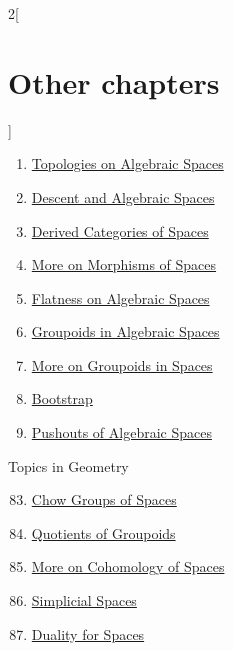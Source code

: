 \begin{multicols}{2}[\section{Other chapters}]
\begin{enumerate}
\item \href{https://github.com/stacks/stacks-project/blob/a04446e57ec1fbc252a871afcec7752fb2807b14/spaces-topologies.tex}{Topologies on Algebraic Spaces}
\item \href{https://github.com/stacks/stacks-project/blob/a04446e57ec1fbc252a871afcec7752fb2807b14/spaces-descent.tex}{Descent and Algebraic Spaces}
\item \href{https://github.com/stacks/stacks-project/blob/a04446e57ec1fbc252a871afcec7752fb2807b14/spaces-perfect.tex}{Derived Categories of Spaces}
\item \href{https://github.com/stacks/stacks-project/blob/a04446e57ec1fbc252a871afcec7752fb2807b14/spaces-more-morphisms.tex}{More on Morphisms of Spaces}
\item \href{https://github.com/stacks/stacks-project/blob/a04446e57ec1fbc252a871afcec7752fb2807b14/spaces-flat.tex}{Flatness on Algebraic Spaces}
\item \href{https://github.com/stacks/stacks-project/blob/a04446e57ec1fbc252a871afcec7752fb2807b14/spaces-groupoids.tex}{Groupoids in Algebraic Spaces}
\item \href{https://github.com/stacks/stacks-project/blob/a04446e57ec1fbc252a871afcec7752fb2807b14/spaces-more-groupoids.tex}{More on Groupoids in Spaces}
\item \href{https://github.com/stacks/stacks-project/blob/a04446e57ec1fbc252a871afcec7752fb2807b14/bootstrap.tex}{Bootstrap}
\item \href{https://github.com/stacks/stacks-project/blob/a04446e57ec1fbc252a871afcec7752fb2807b14/spaces-pushouts.tex}{Pushouts of Algebraic Spaces}
\end{enumerate}
Topics in Geometry
\begin{enumerate}
\setcounter{enumi}{82}
\item \href{https://github.com/stacks/stacks-project/blob/a04446e57ec1fbc252a871afcec7752fb2807b14/spaces-chow.tex}{Chow Groups of Spaces}
\item \href{https://github.com/stacks/stacks-project/blob/a04446e57ec1fbc252a871afcec7752fb2807b14/groupoids-quotients.tex}{Quotients of Groupoids}
\item \href{https://github.com/stacks/stacks-project/blob/a04446e57ec1fbc252a871afcec7752fb2807b14/spaces-more-cohomology.tex}{More on Cohomology of Spaces}
\item \href{https://github.com/stacks/stacks-project/blob/a04446e57ec1fbc252a871afcec7752fb2807b14/spaces-simplicial.tex}{Simplicial Spaces}
\item \href{https://github.com/stacks/stacks-project/blob/a04446e57ec1fbc252a871afcec7752fb2807b14/spaces-duality.tex}{Duality for Spaces}

\end{enumerate}
\end{multicols}
